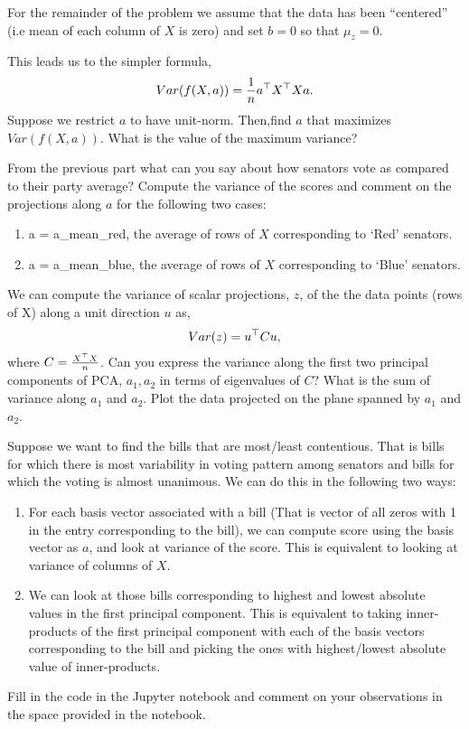 \begin{enumerate}
    For the remainder of the problem we assume that the data has been ``centered'' (i.e  mean of each column of $X$ is zero) and set $b = 0$ so that $\mu_z = 0$.
    
    This leads us to the simpler formula,
    \begin{equation*}
        Var(f(X,a)) = \frac{1}{n}a^{\top} X^{\top} X a.
    \end{equation*}
    Suppose we restrict $a$ to have unit-norm. Then,find $a$ that maximizes $Var(f(X,a))$. What is the value of the maximum variance?

    \sol{
    }
    
	\qitem
	From the previous part what can you say about how senators vote as compared to their party average? Compute the variance of the scores and comment on the projections along $a$ for the following two cases:
	\begin{enumerate}
	    \item a = a\_mean\_red, the average of rows of $X$ corresponding to `Red' senators.
	    \item a = a\_mean\_blue, the average of rows of $X$ corresponding to `Blue' senators.
	\end{enumerate}
	
	\sol{
	}
	
	\qitem
	We can compute the variance of scalar projections, $z$, of the the data points (rows of X) along a unit direction $u$ as, 
	\begin{align*}
	    Var(z) = u^{\top} C u,
	\end{align*}
	where $C = \frac{X^{\top} X}{n}$.
    Can you express the variance along the first two principal components of PCA, $a_1,a_2$ in terms of eigenvalues of $C$? What is the sum of variance along $a_1$ and $a_2$. Plot the data projected on the plane spanned by $a_1$ and $a_2$.
	
	\sol{
	}
	
	
	\qitem
	Suppose we want to find the bills that are most/least contentious. That is bills for which there is most variability in voting pattern among senators and bills for which the voting is almost unanimous. We can do this in the following two ways:
	\begin{enumerate}
	    \item For each basis vector associated with a bill (That is vector of all zeros with 1 in the entry corresponding to the bill), we can compute score using the basis vector as $a$, and look at variance of the score. This is equivalent to looking at variance of columns of $X$.
	    \item We can look at those bills corresponding to highest and lowest absolute values in the first principal component. This is equivalent to taking inner-products of the first principal component with each of the basis vectors corresponding to the bill and picking the ones with highest/lowest absolute value of inner-products. 
	\end{enumerate}
	Fill in the code in the Jupyter notebook and comment on your observations in the space provided in the notebook.
		

\end{enumerate}
